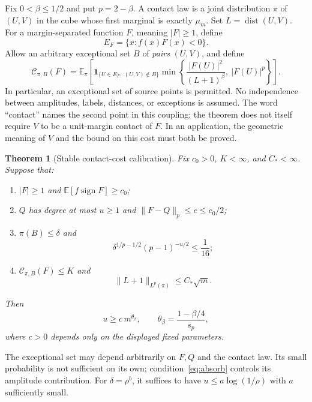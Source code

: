 \documentclass[11pt]{article}
\newtheorem{theorem}{Theorem}[section]
\theoremstyle{remark}\newtheorem{remark}[theorem]{Remark}
\newcommand{\E}{\mathbb E}\newcommand{\Prb}{\mathbb P}
\newcommand{\1}{\mathbf 1}\newcommand{\norm}[2]{\lVert #1\rVert_{#2}}
\newcommand{\dist}{\operatorname{dist}}\newcommand{\sgn}{\operatorname{sign}}
\begin{document}
Fix $0<\beta\le1/2$ and put $p=2-\beta$. A contact law is a joint distribution $\pi$ of $(U,V)$ in the cube whose first marginal is exactly $\mu_m$. Set $L=\dist(U,V)$. For a margin-separated function $F$, meaning $|F|\ge1$, define
\[
 E_F=\{x:f(x)F(x)<0\}.
\]
Allow an arbitrary exceptional set $B$ of \emph{pairs} $(U,V)$, and define
\begin{equation}\label{eq:cost}
 \mathcal C_{\pi,B}(F)
 =\E_\pi\!\left[\mathbf 1_{\{U\in E_F,\ (U,V)\notin B\}}
 \min\left\{\frac{|F(U)|^2}{(L+1)^\beta},\ |F(U)|^p\right\}\right].
\end{equation}
In particular, an exceptional set of source points is permitted. No independence between amplitudes, labels, distances, or exceptions is assumed. The word ``contact'' names the second point in this coupling; the theorem does not itself require $V$ to be a unit-margin contact of $F$. In an application, the geometric meaning of $V$ and the bound on this cost must both be proved.

\begin{theorem}[Stable contact-cost calibration]\label{thm:main}
Fix $c_0>0$, $K<\infty$, and $C_*<\infty$. Suppose that:
\begin{enumerate}
\item $|F|\ge1$ and $\E[f\sgn F]\ge c_0$;
\item $Q$ has degree at most $u\ge1$ and $\norm{F-Q}{p}\le e\le c_0/2$;
\item $\pi(B)\le\delta$ and
\begin{equation}\label{eq:absorb}
 \delta^{1/p-1/2}(p-1)^{-u/2}\le\frac1{16};
\end{equation}
\item $\mathcal C_{\pi,B}(F)\le K$ and
\begin{equation}\label{eq:distance}
 \norm{L+1}{L^p(\pi)}\le C_*\sqrt m.
\end{equation}
\end{enumerate}
Then
\begin{equation}\label{eq:theta}
 u\ge c\,m^{\theta_\beta},\qquad
 \theta_\beta=\frac{1-\beta/4}{s_p},
\end{equation}
where $c>0$ depends only on the displayed fixed parameters.
\end{theorem}

The exceptional set may depend arbitrarily on $F,Q$ and the contact law. Its small probability is not sufficient on its own; condition~\eqref{eq:absorb} controls its amplitude contribution. For $\delta=\rho^b$, it suffices to have $u\le a\log(1/\rho)$ with $a$ sufficiently small.
\end{document}
